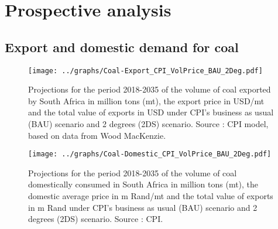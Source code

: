 \documentclass[12pt,english]{article}
\begin{document}
\clearpage
\section{Prospective analysis}

\subsection{Export and domestic demand for coal}



\begin{figure}[!t]
	\centering
	\texttt{[image: ../graphs/Coal-Export\_CPI\_VolPrice\_BAU\_2Deg.pdf]}
	\caption{\label{Coal-Export_CPI_VolPrice_BAU_2DS}\small Projections for the period 2018-2035 of the volume of coal exported by South Africa in million tons (mt), the export price in USD/mt and the total value of exports in USD under CPI's business as usual (BAU) scenario and 2 degrees (2DS) scenario. Source : CPI model, based on data from Wood MacKenzie.}
\end{figure}

\begin{figure}[!t]
	\centering
	\texttt{[image: ../graphs/Coal-Domestic\_CPI\_VolPrice\_BAU\_2Deg.pdf]}
	\caption{\label{Coal-Domestic_CPI_VolPrice_BAU_2DS}\small Projections for the period 2018-2035 of the volume of coal domestically consumed in South Africa in million tons (mt), the domestic average price in m Rand/mt and the total value of exports in m Rand under CPI's business as usual (BAU) scenario and 2 degrees (2DS) scenario. Source : CPI.}
\end{figure}
\end{document}
